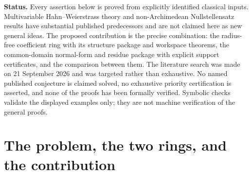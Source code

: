 \documentclass[11pt,letterpaper]{article}
\theoremstyle{definition}
\theoremstyle{remark}
\newcommand{\R}{\mathbb R}
\newcommand{\OO}{\mathcal O}
\numberwithin{equation}{section}
\begin{document}
\begin{titlepage}
\begin{minipage}{0.93\textwidth}
\begin{abstract}
A fourth coefficient ring occurs in this subject under nearly the same
notation and does \emph{not} carry the package above: the fixed-polydisk
ring $\OO(D)((t^\Gamma))$, whose coefficients are all holomorphic on one
disk held fixed once and for all. We give its positive theory separately.
Its geometric localizations are discrete valuation rings with completion
$K[[X]]$, exactly as for the germ rings; but for $\Gamma=\R$ it is a
complete uniform non-Archimedean Banach algebra in which an explicit pair
$h,F$ with $\inf\max\{|h|_v,|F|_v\}=e^{-2}>0$ generates a proper,
nonprincipal, two-generated ideal with empty geometric zero set, the
distance from $1$ to it being exactly one and the obstruction surviving
every enlargement of the value group; the exact criterion is finiteness,
not boundedness, of a leading-valuation set. Separately, one fibre of its
prime spectrum over a single classical free maximal ideal of $\OO(D)$ is a
domain of infinite Krull dimension carrying a continuum chain of primes
below an explicit nongeometric maximal ideal, and the ring is not
Noetherian.
\end{abstract}
\end{minipage}
\vfill
\begin{minipage}{0.93\textwidth}\small
\textbf{Status.} Every assertion below is proved from explicitly identified
classical inputs. Multivariable Hahn--Weierstrass theory and
non-Archimedean Nullstellensatz results have substantial published
predecessors and are not claimed here as new general ideas. The proposed
contribution is the precise combination: the radius-free coefficient ring
with its structure package and workspace theorems, the common-domain
normal-form and residue package with explicit support certificates, and the
comparison between them. The literature search was made on 21 September
2026 and was targeted rather than exhaustive. No named published conjecture
is claimed solved, no exhaustive priority certification is asserted, and
none of the proofs has been formally verified. Symbolic checks validate the
displayed examples only; they are not machine verification of the general
proofs.
\end{minipage}
\end{titlepage}

\hypersetup{pageanchor=true}
\tableofcontents
\clearpage
{}

\section{The problem, the two rings, and the contribution}\label{analytic:sec:intro}
\end{document}
